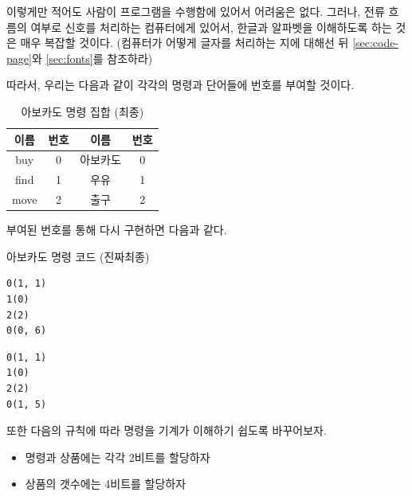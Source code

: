 \documentclass{article}
\begin{document}
이렇게만 적어도 사람이 프로그램을 수행함에 있어서 어려움은 없다.
그러나, 전류 흐름의 여부로 신호를 처리하는 컴퓨터에게 있어서,
한글과 알파벳을 이해하도록 하는 것은 매우 복잡할 것이다.
(컴퓨터가 어떻게 글자를 처리하는 지에 대해선 뒤
\autoref{sec:code-page}와 \autoref{sec:fonts}를 참조하라)

따라서, 우리는 다음과 같이 각각의 명령과 단어들에 번호를 부여할 것이다.

\begin{table}[!h]
    \centering

    \caption{아보카도 명령 집합 (최종)}
    \label{Tab:avocado-isa-int}

    \begin{tabular}{ || c | c | c | c || }
        \hline
        이름 & 번호 & 이름     & 번호 \\
        \hline\hline
        buy  & 0    & 아보카도 & 0    \\
        \hline
        find & 1    & 우유     & 1    \\
        \hline
        move & 2    & 출구     & 2    \\
        \hline
    \end{tabular}
\end{table}

부여된 번호를 통해 다시 구현하면 다음과 같다.

\begin{center}

    \centering

    아보카도 명령 코드 (진짜최종)

    \begin{minipage}{0.45\textwidth}
        \begin{lstlisting}
0(1, 1)
1(0)
2(2)
0(0, 6)
        \end{lstlisting}
    \end{minipage}
    \hfill
    \begin{minipage}{0.45\textwidth}
        \begin{lstlisting}
0(1, 1)
1(0)
2(2)
0(1, 5)
        \end{lstlisting}
    \end{minipage}

\end{center}

또한 다음의 규칙에 따라 명령을 기계가 이해하기 쉽도록 바꾸어보자.

\begin{itemize}
    \item 명령과 상품에는 각각 2비트를 할당하자
    \item 상품의 갯수에는 4비트를 할당하자
\end{itemize}
\end{document}
